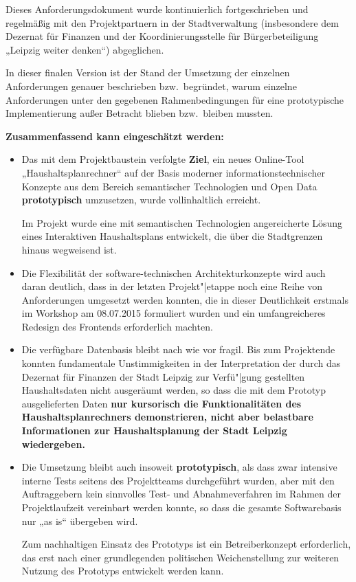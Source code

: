 \documentclass[11pt,a4paper,twoside]{article}
\begin{document}
Dieses Anforderungsdokument wurde kontinuierlich fortgeschrieben und
regelmäßig mit den Projektpartnern in der Stadtverwaltung (insbesondere dem
Dezernat für Finanzen und der Koordinierungsstelle für Bürgerbeteiligung
„Leipzig weiter denken“) abgeglichen.

In dieser finalen Version ist der Stand der Umsetzung der einzelnen
Anforderungen genauer beschrieben bzw.\ begründet, warum einzelne Anforderungen
unter den gegebenen Rahmenbedingungen für eine prototypische Implementierung
außer Betracht blieben bzw.\ bleiben mussten. 

\textbf{Zusammenfassend kann eingeschätzt werden:}
\begin{itemize}
\item Das mit dem Projektbaustein verfolgte \textbf{Ziel}, ein neues
  Online-Tool „Haushaltsplanrechner“ auf der Basis moderner
  informationstechnischer Konzepte aus dem Bereich semantischer Technologien
  und Open Data \textbf{prototypisch} umzusetzen, wurde vollinhaltlich
  erreicht.

  Im Projekt wurde eine mit semantischen Technologien angereicherte Lösung
  eines Interaktiven Haushaltsplans entwickelt, die über die Stadtgrenzen
  hinaus wegweisend ist.

\item Die Flexibilität der software-technischen Architekturkonzepte wird auch
  daran deutlich, dass in der letzten Projekt"|etappe noch eine Reihe von
  Anforderungen umgesetzt werden konnten, die in dieser Deutlichkeit erstmals
  im Workshop am 08.07.2015 formuliert wurden und ein umfangreicheres Redesign
  des Frontends erforderlich machten.
\item Die verfügbare Datenbasis bleibt nach wie vor fragil.  Bis zum
  Projektende konnten fundamentale Unstimmigkeiten in der Interpretation der
  durch das Dezernat für Finanzen der Stadt Leipzig zur Verfü"|gung gestellten
  Haushaltsdaten nicht ausgeräumt werden, so dass die mit dem Prototyp
  ausgelieferten Daten \textbf{nur kursorisch die Funktionalitäten des
    Haushaltsplanrechners demonstrieren, nicht aber belastbare Informationen
    zur Haushaltsplanung der Stadt Leipzig wiedergeben.}
\item Die Umsetzung bleibt auch insoweit \textbf{prototypisch}, als dass zwar
  intensive interne Tests seitens des Projektteams durchgeführt wurden, aber
  mit den Auftraggebern kein sinnvolles Test- und Abnahmeverfahren im Rahmen
  der Projektlaufzeit vereinbart werden konnte, so dass die gesamte
  Softwarebasis nur „as is“ übergeben wird.  

  Zum nachhaltigen Einsatz des Prototyps ist ein Betreiberkonzept erforderlich,
  das erst nach einer grundlegenden politischen Weichenstellung zur weiteren
  Nutzung des Prototyps entwickelt werden kann.
\end{itemize}
\end{document}
